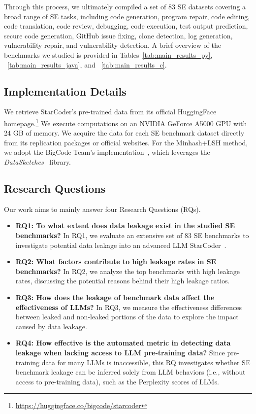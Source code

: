 Through this process, we ultimately compiled a set of 83 SE datasets covering a broad range of SE tasks, including code generation, program repair, code editing, code translation, code review, debugging, code execution, test output prediction, secure code generation, GitHub issue fixing, clone detection, log generation, vulnerability repair, and vulnerability detection.
A brief overview of the benchmarks we studied is provided in Tables~\ref{tab:main_results_py}, ~\ref{tab:main_results_java}, and ~\ref{tab:main_results_c}.








\vspace{-0.2cm}
\subsection{Implementation Details}
We retrieve StarCoder's pre-trained data from its official HuggingFace homepage.\footnote{\url{https://huggingface.co/bigcode/starcoder}} We execute computations on an NVIDIA GeForce A5000 GPU with 24 GB of memory. We acquire the data for each SE benchmark dataset directly from its replication packages or official websites. For the Minhash+LSH method, we adopt the BigCode Team’s implementation~\cite{bigcode}, which leverages the \textit{\textsf{DataSketches}}~\cite{datasketch} library.



\vspace{-0.2cm}
\subsection{Research Questions}
Our work aims to mainly answer four Research Questions (RQs). 
\begin{itemize}[leftmargin=*]
\item \textbf{RQ1: To what extent does data leakage exist in the studied SE benchmarks?} 
In RQ1, we evaluate an extensive set of 83 SE benchmarks to investigate potential data leakage into an advanced LLM StarCoder~\cite{starcoder_one}.
\item \textbf{RQ2: What factors contribute to high leakage rates in SE benchmarks?}
In RQ2, we analyze the top benchmarks with high leakage rates, discussing the potential reasons behind their high leakage ratios. 
\item \textbf{RQ3: How does the leakage of benchmark data affect the effectiveness of LLMs?} 
In RQ3, we measure the effectiveness differences between leaked and non-leaked portions of the data to explore the impact caused by data leakage.
\item \textbf{RQ4: How effective is the automated metric in detecting data leakage when lacking access to LLM pre-training data?} 
Since pre-training data for many LLMs is inaccessible, this RQ investigates whether SE benchmark leakage can be inferred solely from LLM behaviors (i.e., without access to pre-training data), such as the Perplexity scores of LLMs. 
\end{itemize}



